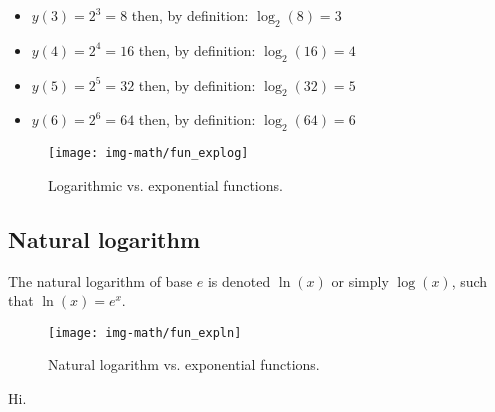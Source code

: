 \begin{itemize}
  \item $y(3) = 2^3 = 8$ \quad then, by definition: \quad $\log_2(8) = 3$
  \item $y(4) = 2^4 = 16$ \quad then, by definition: \quad $\log_2(16) = 4$
  \item $y(5) = 2^5 = 32$ \quad then, by definition: \quad $\log_2(32) = 5$
  \item $y(6) = 2^6 = 64$ \quad then, by definition: \quad $\log_2(64) = 6$
\end{itemize}

\begin{knitrout}
\color{fgcolor}\begin{figure}[]

\texttt{[image: img-math/fun\_explog]} \caption{Logarithmic vs. exponential functions.\label{fig:fun_explog}}
\end{figure}


\end{knitrout}


\subsection{Natural logarithm}

The natural logarithm of base $e$ is denoted $\ln(x)$ or simply $\log(x)$, such that $\ln(x)=e^x$.

\begin{knitrout}
\color{fgcolor}\begin{figure}[]

\texttt{[image: img-math/fun\_expln]} \caption{Natural logarithm vs. exponential functions.\label{fig:fun_expln}}
\end{figure}


\end{knitrout}


Hi.

